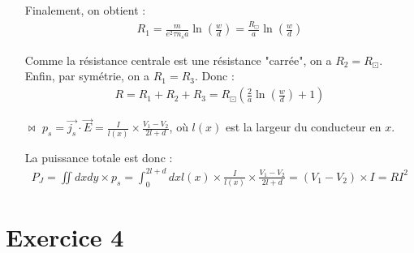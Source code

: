 \documentclass{report}
\begin{document}
\begin{itemize}
	Finalement, on obtient :
	\begin{align*}
		R_1=\frac{m}{e^2\tau n_sa}\ln\left(\frac{w}{d} \right) =\frac{R_\boxdot}{a}\ln\left(\frac{w}{d} \right)
	\end{align*}
	
	Comme la résistance centrale est une résistance "carrée", on a $R_2=R_\boxdot$. Enfin, par symétrie, on a $R_1=R_3$. Donc :
	\begin{align*}
		R = R_1+R_2+R_3 = R_\boxdot\left(\frac{2}{a}\ln\left(\frac{w}{d} \right)+1 \right) 
	\end{align*}
	
	
	\item[$\bowtie$] $p_s=\vec{j_s}\cdot\vec{E}=\frac{I}{l(x)}\times\frac{V_1-V_2}{2l+d}$, où $l(x)$ est la largeur du conducteur en $x$. 
	
	La puissance totale est donc :
	\begin{align*}
	P_J = \iint dx dy\times p_s = \int_{0}^{2l+d} dx l(x)\times\frac{I}{l(x)}\times\frac{V_1-V_2}{2l+d} = (V_1-V_2)\times I= RI^2
	\end{align*}

\end{itemize}

\section*{Exercice 4}
\end{document}
